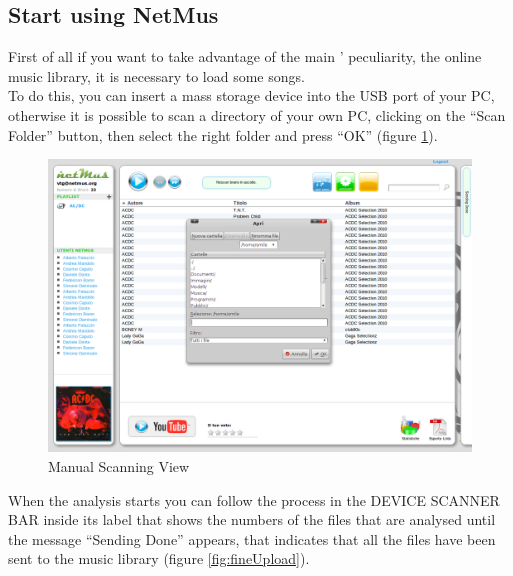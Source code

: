 \newpage
\subsection{Start using NetMus}

First of all if you want to take advantage of the main ' peculiarity,
the online music library, it is necessary to load some songs.\\
To do this, you can insert a mass storage device
into the USB port of your PC, otherwise it is possible to scan a directory of
your own PC, clicking on the ``Scan Folder'' button, then select the right
folder and press ``OK'' (figure \ref{fig:scansioneManuale}).\\

\begin{figure}[!htbp]
  \centering
  \includegraphics[width=15cm]{img/MU/scan_manual.png}
\caption{Manual Scanning View}
\label{fig:scansioneManuale}
\end{figure}

When the analysis starts you can follow the process in the DEVICE SCANNER BAR
inside its label that shows the numbers of the files that are analysed until
the message ``Sending Done'' appears, that indicates that all the files have
been sent to the music library (figure \ref{fig:fineUpload}).\\

